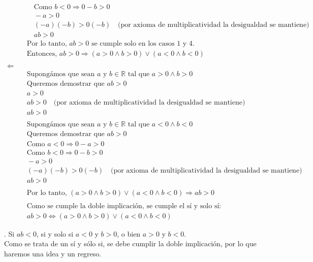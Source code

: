 \documentclass{article}
\begin{document}
\begin{align*}
&\quad \quad \text{Como } b < 0 \Rightarrow 0 - b > 0 \\
&\quad \quad -a > 0 \\
&\quad \quad (-a)(-b) > 0(-b) \quad \text{(por axioma de multiplicatividad la desigualdad se mantiene)} \\
&\quad \quad ab > 0 \\
&\quad \text{Por lo tanto, } ab > 0 \text{ se cumple solo en los casos 1 y 4.} \\
&\quad \text{Entonces, } ab > 0 \Rightarrow (a > 0 \land b > 0) \lor (a < 0 \land b < 0) \\
\\
\text{$\Leftarrow$}\\
&\quad \text{Supongámos que sean } a \text{ y } b \in \mathbb{R} \text{ tal que } a > 0 \land b > 0 \\
&\quad \text{Queremos demostrar que } ab > 0 \\
&\quad a > 0 \\
&\quad ab > 0 \quad \text{(por axioma de multiplicatividad la desigualdad se mantiene)} \\
&\quad ab > 0 \\
\\
&\quad \text{Supongámos que sean } a \text{ y } b \in \mathbb{R} \text{ tal que } a < 0 \land b < 0 \\
&\quad \text{Queremos demostrar que } ab > 0 \\
&\quad \text{Como } a < 0 \Rightarrow 0 - a > 0 \\
&\quad \text{Como } b < 0 \Rightarrow 0 - b > 0 \\
&\quad -a > 0 \\
&\quad (-a)(-b) > 0(-b) \quad \text{(por axioma de multiplicatividad la desigualdad se mantiene)} \\
&\quad ab > 0 \\
\\
&\quad \text{Por lo tanto, } (a > 0 \land b > 0) \lor (a < 0 \land b < 0) \Rightarrow ab > 0 \\
\\
&\quad \text{Como se cumple la doble implicación, se cumple el sí y solo sí:} \\
&\quad ab > 0 \iff (a > 0 \land b > 0) \lor (a < 0 \land b < 0)
\end{align*}

  . Si \(ab<0\), si y solo si \(a<0\) y \(b>0\), o bien \(a>0\) y \(b<0\).\\

Como se trata de un sí y sólo si, se debe cumplir la doble implicación, por lo que haremos una idea y un regreso.
\end{document}
